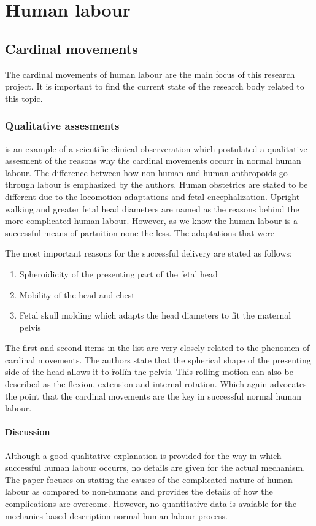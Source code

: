 \section{Human labour}

\subsection{Cardinal movements}

  The cardinal movements of human labour are the main focus of this research project. It is important to find the current state of the research body related to this topic.

  \subsubsection{Qualitative assesments}

  \citep{abitbol1993} is an example of a scientific clinical observeration which postulated a qualitative assesment of the reasons why the cardinal movements occurr in normal human labour. The difference between how non-human and human anthropoids go through labour is emphasized by the authors. Human obstetrics are stated to be different due to the locomotion adaptations and fetal encephalization. Upright walking and greater fetal head diameters are named as the reasons behind the more complicated human labour. However, as we know the human labour is a successful means of partuition none the less. The adaptations that were

  The most important reasons for the successful delivery are stated as follows:

  \begin{enumerate}

    \item Spheroidicity of the presenting part of the fetal head
    \item Mobility of the head and chest
    \item Fetal skull molding which adapts the head diameters to fit the maternal pelvis

  \end{enumerate}

  The first and second items in the list are very closely related to the phenomen of cardinal movements. The authors state that the spherical shape of the presenting side of the head allows it to \"roll\" in the pelvis. This rolling motion can also be described as the flexion, extension and internal rotation. Which again advocates the point that the cardinal movements are the key in successful normal human labour.

  \paragraph{Discussion} Although a good qualitative explanation is provided for the way in which successful human labour occurrs, no details are given for the actual mechanism. The paper focuses on stating the causes of the complicated nature of human labour as compared to non-humans and provides the details of how the complications are overcome. However, no quantitative data is avaiable for the mechanics based description normal human labour process.
